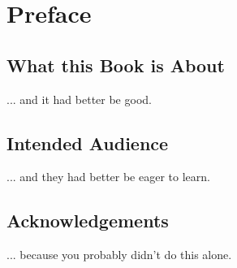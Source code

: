 
\chapter*{Preface}\label{chap:preface}

\section*{What this Book is About}
... and it had better be good.

\section*{Intended Audience}
... and they had better be eager to learn.

\section*{Acknowledgements}
... because you probably didn't do this alone.
